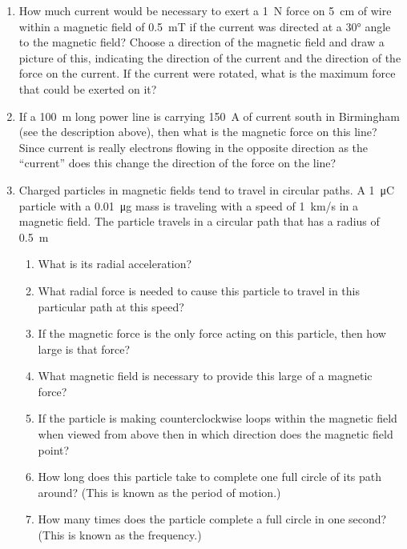 \begin{enumerate}
\item
How much current would be necessary to exert a \SI{1}{\newton} force on \SI{5}{cm} of wire within a magnetic field of \SI{0.5}{\milli\tesla} if the current was directed at a \ang{30} angle to the magnetic field? Choose a direction of the magnetic field and draw a picture of this, indicating the direction of the current and the direction of the force on the current. If the current were rotated, what is the maximum force that could be exerted on it?

\item
If a \SI{100}{\meter} long power line is carrying \SI{150}{\ampere} of current south in Birmingham (see the description above), then what is the magnetic force on this line? Since current is really electrons flowing in the opposite direction as the ``current'' does this change the direction of the force on the line?

\item
Charged particles in magnetic fields tend to travel in circular paths. A \SI{1}{\micro\coulomb} particle with a \SI{0.01}{\micro\gram} mass is traveling with a speed of \SI{1}{km/s} in a magnetic field. The particle travels in a circular path that has a radius of \SI{0.5}{\meter}
\begin{enumerate}
	\setlength\itemsep{2 in}
	\item What is its radial acceleration?
	\item What radial force is needed to cause this particle to travel in this particular path at this speed?
	\item If the magnetic force is the only force acting on this particle, then how large is that force?
	\item What magnetic field is necessary to provide this large of a magnetic force?
	\item If the particle is making counterclockwise loops within the magnetic field when viewed from above then in which direction does the magnetic field point?
	\item How long does this particle take to complete one full circle of its path around? (This is known as the period of motion.)
	\item How many times does the particle complete a full circle in one second? (This is known as the frequency.)
\end{enumerate}



\end{enumerate}
